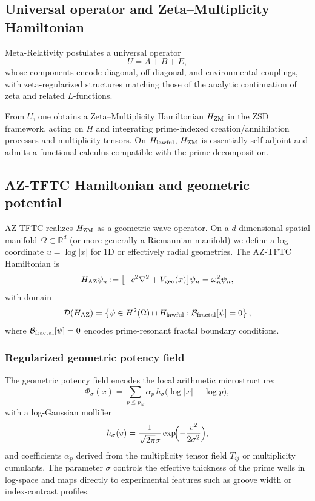 \documentclass[11pt]{article}
\begin{document}
\subsection{Universal operator and Zeta--Multiplicity Hamiltonian}

Meta-Relativity postulates a universal operator
\begin{equation}
U = A + B + E,
\end{equation}
whose components encode diagonal, off-diagonal, and environmental couplings, with zeta-regularized structures matching those of the analytic continuation of zeta and related $L$-functions.\cite{MetaRel}

From $U$, one obtains a Zeta--Multiplicity Hamiltonian $H_{\rm ZM}$ in the ZSD framework, acting on $H$ and integrating prime-indexed creation/annihilation processes and multiplicity tensors.\cite{ZSD}
On $H_{\rm lawful}$, $H_{\rm ZM}$ is essentially self-adjoint and admits a functional calculus compatible with the prime decomposition.

\subsection{AZ-TFTC Hamiltonian and geometric potential}

AZ-TFTC realizes $H_{\rm ZM}$ as a geometric wave operator.
On a $d$-dimensional spatial manifold $\Omega\subset\mathbb{R}^d$ (or more generally a Riemannian manifold) we define a log-coordinate $u=\log|x|$ for 1D or effectively radial geometries.
The AZ-TFTC Hamiltonian is
\begin{equation}
H_{\rm AZ}\psi_n := \bigl[-c^2\nabla^2 + V_{\rm geo}(x)\bigr]\psi_n = \omega_n^2 \psi_n,
\end{equation}
with domain
\begin{equation}
\mathcal{D}(H_{\rm AZ}) = 
\left\{\psi\in H^2(\Omega)\cap H_{\rm lawful} : \mathcal{B}_{\rm fractal}[\psi]=0\right\},
\end{equation}
where $\mathcal{B}_{\rm fractal}[\psi]=0$ encodes prime-resonant fractal boundary conditions.

\subsubsection{Regularized geometric potency field}

The geometric potency field encodes the local arithmetic microstructure:
\begin{equation}
\Phi_\sigma(x)
  = \sum_{p\le p_N}\alpha_p\,h_\sigma\bigl(\log|x|-\log p\bigr),
\end{equation}
with a log-Gaussian mollifier
\begin{equation}
h_\sigma(v)
  = \frac{1}{\sqrt{2\pi}\sigma}\exp\!\Bigl(-\frac{v^2}{2\sigma^2}\Bigr),
\end{equation}
and coefficients $\alpha_p$ derived from the multiplicity tensor field $T_{ij}$ or multiplicity cumulants.\cite{MultiplicityBohmian}
The parameter $\sigma$ controls the effective thickness of the prime wells in log-space and maps directly to experimental features such as groove width or index-contrast profiles.
\end{document}
